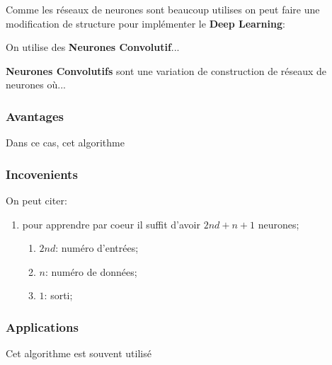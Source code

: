 \documentclass{article}
\begin{document}
Comme les réseaux de neurones sont beaucoup utilises on peut faire une modification de structure pour implémenter le \textbf{Deep Learning}:
\begin{definition}
    On utilise des \textbf{Neurones Convolutif}...

    \begin{remark}
        \textbf{Neurones Convolutifs} sont une variation de construction de réseaux de neurones où...
    \end{remark}
\end{definition}
\subsubsection{Avantages}
Dans ce cas, cet algorithme 

\subsubsection{Incovenients}
On peut citer:
\begin{enumerate}[noitemsep, rightmargin=\leftmargin]
    \item pour apprendre par coeur il suffit d'avoir $2nd + n + 1$ neurones;
    \begin{enumerate}[noitemsep]
        \item $2nd$: numéro d'entrées;
        \item $n$: numéro de données;
        \item $1$: sorti;
    \end{enumerate} 
\end{enumerate}

\subsubsection{Applications}
Cet algorithme est souvent utilisé 





\end{document}
